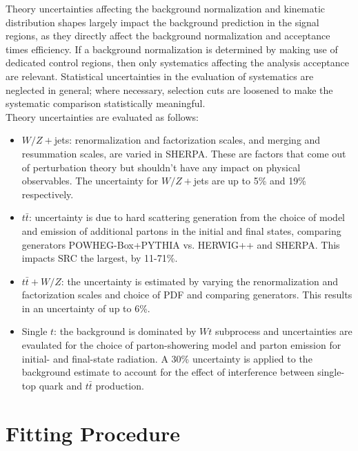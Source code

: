 Theory uncertainties affecting the background normalization and kinematic distribution shapes largely impact the background prediction in the signal regions, as they directly affect the background normalization and acceptance times efficiency. If a background normalization is determined by making use of dedicated control regions, then only systematics affecting the analysis acceptance are relevant. Statistical uncertainties in the evaluation of systematics are neglected in general; where necessary, selection cuts are loosened to make the systematic comparison statistically meaningful. \\ %

Theory uncertainties are evaluated as follows:
\begin{itemize}
	\item $W/Z+$jets: renormalization and factorization scales, and merging and resummation scales, are varied in SHERPA.  These are factors that come out of perturbation theory but shouldn't have any impact on physical observables.  The uncertainty for $W/Z+$jets are up to 5\% and 19\% respectively.
	\item $t\bar{t}$: uncertainty is due to hard scattering generation from the choice of model and emission of additional partons in the initial and final states, comparing generators POWHEG-Box+PYTHIA vs. HERWIG++ and SHERPA.  This impacts SRC the largest, by 11-71\%.
	\item $t\bar{t}+W/Z$: the uncertainty is estimated by varying the renormalization and factorization scales and choice of PDF and comparing generators.  This results in an uncertainty of up to 6\%.
	\item Single $t$: the background is dominated by $Wt$ subprocess and uncertainties are evaulated for the choice of parton-showering model and parton emission for initial- and final-state radiation.  A 30\% uncertainty is applied to the background estimate to account for the effect of interference between single-top quark and $t\bar{t}$ production.
\end{itemize}


\section{Fitting Procedure}
\label{sec:fitting}

